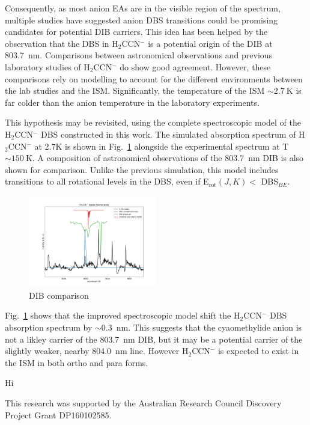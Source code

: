 \documentclass[journal=jpcafh,manuscript=article,layout=onecolumn, 12pt]{achemso}
\begin{document}
Consequently, as most anion EAs are in the visible region of the spectrum, multiple studies have suggested anion DBS transitions could be promising candidates for potential DIB carriers. This idea has been helped by the observation that the DBS in H$_2$CCN$^-$ is a potential origin of the DIB at 803.7~nm. Comparisons between astronomical observations and previous laboratory studies of H$_2$CCN$^-$ do show good agreement. However, these comparisons rely on modelling to account for the different environments between the lab studies and the ISM. Significantly, the temperature of the ISM $\sim2.7~$K is far colder than the anion temperature in the laboratory experiments.

This hypothesis may be revisited, using the complete spectroscopic model of the H$_2$CCN$^-$ DBS constructed in this work. The simulated absorption spectrum of H$_2$CCN$^-$ at 2.7K is shown in Fig.~\ref{fig:DIB} alongside the experimental spectrum at T$\sim150~$K. A composition of astronomical observations of the 803.7~nm DIB is also shown for comparison. Unlike the previous simulation, this model includes transitions to all rotational levels in the DBS, even if E$_{\text{rot}}(J,K)< $ DBS$_{BE}$.

\begin{figure}
	\includegraphics[width=0.5\textwidth]{scripts/DIB}
	\caption{DIB comparison}
	\label{fig:DIB}
\end{figure}

Fig.~\ref{fig:DIB} shows that the improved spectroscopic model shift the H$_2$CCN$^-$ DBS absorption spectrum by $\sim0.3$~nm. This suggests that the cyaomethylide anion is not a likley carrier of the 803.7~nm DIB, but it may be a potential carrier of the slightly weaker, nearby 804.0~nm line. However H$_2$CCN$^-$ is expected to exist in the ISM in both ortho and para forms. 





Hi~\cite{law17}

\begin{acknowledgement}
	This research was supported by the Australian Research Council Discovery
	Project Grant DP160102585.   
\end{acknowledgement}


\end{document}

